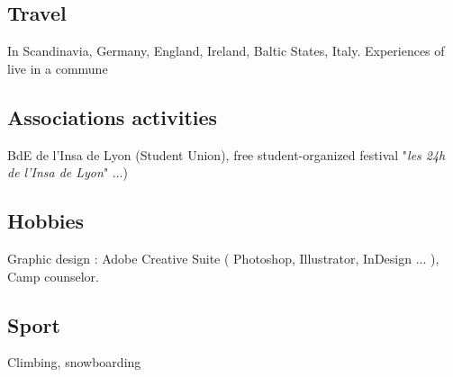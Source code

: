 	\subsection{Travel}
		{In Scandinavia, Germany, England, Ireland, Baltic States, Italy. Experiences of live in a commune}
		
	\subsection{Associations activities}
		{BdE de l'Insa de Lyon (Student Union), free student-organized festival "\textit{les 24h de l'Insa de Lyon}" ...)}
		
	\subsection{Hobbies}
		{Graphic design : Adobe Creative Suite ( Photoshop, Illustrator, InDesign ... ),\\Camp counselor.}
		
	\subsection{Sport}
		{Climbing, snowboarding}
		
